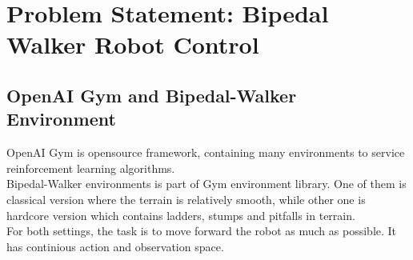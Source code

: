 \section{Problem Statement: Bipedal Walker Robot Control}
\label{sec:problem_statement}
\subsection{OpenAI Gym and Bipedal-Walker Environment}
\label{gym_bipedal}
OpenAI Gym \cite{brockman_openai_2016} is opensource framework, containing many environments to service reinforcement learning algorithms. \\
Bipedal-Walker environments \cite{noauthor_bipedalwalker-v2_2021} \cite{noauthor_bipedalwalkerhardcore-v2_2021} is part of Gym environment library. One of them is classical version where the terrain is relatively smooth, while other one is hardcore version which contains ladders, stumps and pitfalls in terrain. \\
For both settings, the task is to move forward the robot as much as possible. It has continious action and observation space. \\
